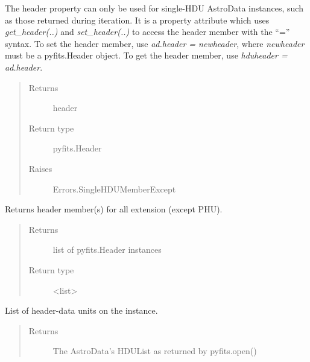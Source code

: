\documentclass[letterpaper,10pt,english]{sphinxmanual}
\begin{document}
\begin{fulllineitems}
\begin{fulllineitems}
The header property can only be used for single-HDU AstroData
instances, such as those returned during iteration. It is a
property attribute which uses \emph{get\_header(..)} and
\emph{set\_header(..)} to access the header member with the ``='' syntax.
To set the header member, use \emph{ad.header = newheader}, where
\emph{newheader} must be a pyfits.Header object. To get the header
member, use \emph{hduheader = ad.header}.
\begin{quote}\begin{description}
\item[{Returns}] \leavevmode
header

\item[{Return type}] \leavevmode
pyfits.Header

\item[{Raises }] \leavevmode
Errors.SingleHDUMemberExcept

\end{description}\end{quote}

\end{fulllineitems}


\begin{fulllineitems}
\label{astro_class:astrodata.AstroData.AstroData.headers}
Returns header member(s) for all extension (except PHU).
\begin{quote}\begin{description}
\item[{Returns}] \leavevmode
list of pyfits.Header instances

\item[{Return type}] \leavevmode
\textless{}list\textgreater{}

\end{description}\end{quote}

\end{fulllineitems}


\begin{fulllineitems}
\label{astro_class:astrodata.AstroData.AstroData.hdulist}
List of header-data units on the instance.
\begin{quote}\begin{description}
\item[{Returns}] \leavevmode
The AstroData's HDUList as returned by pyfits.open()


\end{description}
\end{quote}
\end{fulllineitems}
\end{fulllineitems}
\end{document}
